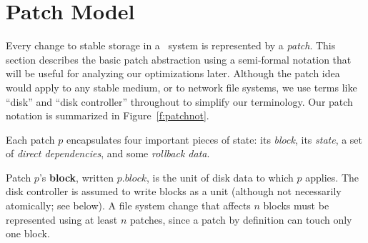 
\section{Patch Model}
\label{sec:patch}

\makeatletter
\let\emptyset\varnothing
\newcommand{\PState}[1]{\ensuremath{#1.\textit{state}}}
\newcommand{\PBlock}[1]{\ensuremath{#1.\textit{block}}}
\newcommand{\PMemst}{\ensuremath{\textit{mem}}}
\newcommand{\PInfst}{\ensuremath{\textit{flight}}}
\newcommand{\PDiskst}{\ensuremath{\textit{disk}}}
\newcommand{\PSetlim}[1]{\def\@next{#1}\ifx\@next\@empty\else[\@next]\fi}
\newcommand{\PMem}[1][]{\ensuremath{\textit{Mem}\PSetlim{#1}}}
\newcommand{\PInf}[1][]{\ensuremath{\textit{Flight}\PSetlim{#1}}}
\newcommand{\PDisk}[1][]{\ensuremath{\textit{Disk}\PSetlim{#1}}}
\newcommand{\PHard}[1][]{\ensuremath{\textit{\Nrb}\PSetlim{#1}}}
\newcommand{\PSoft}[1][]{\ensuremath{\textit{\Rb}\PSetlim{#1}}}
\newcommand{\PEmpty}[1][]{\ensuremath{\textit{\Noop}\PSetlim{#1}}}
\newcommand{\PDDepset}[1]{\ensuremath{\def\@next{#1}\ifx\@next\@empty\else\@next.\fi\textit{ddeps}}}
\newcommand{\PDepend}{\ensuremath{\leadsto}}
\newcommand{\PDDepend}{\ensuremath{\rightarrow}}
\newcommand{\PDepset}[1]{\ensuremath{\textit{Dep}[#1]}}
\newcommand{\PRDepset}[1]{\ensuremath{\textit{RDep}[#1]}}
\makeatother

Every change to stable storage in a \Kudos\ system is represented by a
\emph{patch}.
%
This section describes the basic patch abstraction using a semi-formal
notation that will be useful for analyzing our optimizations later.
%
Although the patch idea would apply to any stable medium, or to network
file systems, we use terms like ``disk'' and ``disk controller'' throughout
to simplify our terminology.
%
Our patch notation is summarized in Figure~\ref{f:patchnot}.

Each patch $p$ encapsulates four important pieces of state: its
 \emph{block}, its \emph{state}, a set of \emph{direct dependencies}, and
 some \emph{rollback data}.

Patch $p$'s \textbf{block}, written $\PBlock{p}$, is the unit of disk data
 to which $p$ applies.  The disk controller is assumed to write blocks as a
 unit (although not necessarily atomically; see below).  A file system
 change that affects $n$ blocks must be represented using at least $n$
 patches, since a patch by definition can touch only one block.

